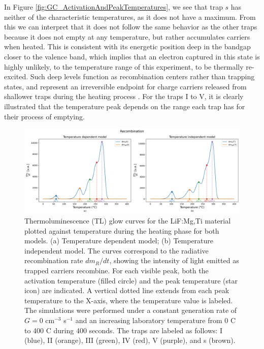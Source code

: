 \vspace{10pt}

In Figure \ref{fig:GC_ActivationAndPeakTemperatures}, we see that trap $s$ has neither of the characteristic temperatures, as it does not have a maximum. From this we can interpret that it does not follow the same behavior as the other traps because it does not empty at any temperature, but rather accumulates carriers when heated. This is consistent with its energetic position deep in the bandgap closer to the valence band, which implies that an electron captured in this state is highly unlikely, to the temperature range of this experiment, to be thermally re-excited. Such deep levels function as recombination centers rather than trapping states, and represent an irreversible endpoint for charge carriers released from shallower traps during the heating process \cite{mckeever_course_2022}. For the traps I to V, it is clearly illustrated that the temperature peak depends on the range each trap has for their process of emptying.

\vspace{10pt}

\begin{figure}[ht]
    \centering
    \includegraphics[width=\textwidth]{Images/GC_GlowCurve.png}
    \caption{Thermoluminescence (TL) glow curves for the LiF:Mg,Ti material plotted against temperature during the heating phase for both models. (a) Temperature dependent model; (b) Temperature independent model. The curves correspond to the radiative recombination rate $dm_R/dt$, showing the intensity of light emitted as trapped carriers recombine. For each visible peak, both the activation temperature (filled circle) and the peak temperature (star icon) are indicated. A vertical dotted line extends from each peak temperature to the X-axis, where the temperature value is labeled. The simulations were performed under a constant generation rate of $G = 0$ cm$^{-3}$ s$^{-1}$ and an increasing laboratory temperature from 0 \textdegree C to 400 \textdegree C during 400 seconds. The traps are labeled as follows: I (blue), II (orange), III (green), IV (red), V (purple), and s (brown).}
    \label{fig:heating_TLGlowCurve}
\end{figure}


